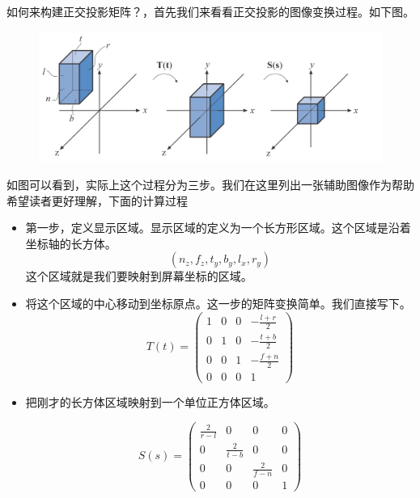 \documentclass{article} \usepackage{braket} \usepackage{amsmath,amssymb} \usepackage{geometry} \usepackage{graphicx} \usepackage{braket} \usepackage{bm}\usepackage{hyperref} \usepackage{CJKutf8}
\begin{document}
\begin{CJK}{UTF8}{gbsn}
  如何来构建正交投影矩阵？，首先我们来看看正交投影的图像变换过程。如下图。

  \begin{figure}[htbp]
    \centering
    \includegraphics[width=1.0\linewidth]{pic-2.jpg}
  \end{figure}

  如图可以看到，实际上这个过程分为三步。我们在这里列出一张辅助图像作为帮助希望读者更好理解，下面的计算过程
  \begin{itemize}
  \item 第一步，定义显示区域。显示区域的定义为一个长方形区域。这个区域是沿着坐标轴的长方体。
    \begin{displaymath}
      (n_z,f_z,t_y,b_y,l_x,r_y)
    \end{displaymath}
    这个区域就是我们要映射到屏幕坐标的区域。
  \item 将这个区域的中心移动到坐标原点。这一步的矩阵变换简单。我们直接写下。
    \begin{displaymath}
      T(t)=\left(
        \begin{array}{cccc}
          1 & 0 & 0 & -\frac{l+r}{2} \\
          0 & 1 & 0 & -\frac{t+b}{2} \\
          0 & 0 & 1 & -\frac{f+n}{2} \\
          0 & 0 & 0 & 1 
        \end{array}
      \right)
    \end{displaymath}
  \item 把刚才的长方体区域映射到一个单位正方体区域。

    \begin{displaymath}
      S(s) = \left(
        \begin{array}{cccc}
          \frac{2}{r-l} & 0 & 0 & 0 \\
          0 & \frac{2}{t-b} & 0 & 0 \\
          0 & 0 & \frac{2}{f-n} & 0 \\
          0 & 0 & 0 & 1 
        \end{array}
      \right)
    \end{displaymath}
  \end{itemize}


\end{CJK}
\end{document}
